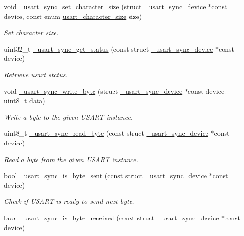 \begin{DoxyCompactItemize}
void \hyperlink{group___h_p_l_ga45ebffe94571d266e42b3dd882ad559d}{\+\_\+usart\+\_\+sync\+\_\+set\+\_\+character\+\_\+size} (struct \hyperlink{struct__usart__sync__device}{\+\_\+usart\+\_\+sync\+\_\+device} $\ast$const device, const enum \hyperlink{group___h_p_l_ga631ce7b4f60dccd392e6d6ef7d3cd4e2}{usart\+\_\+character\+\_\+size} size)
\begin{DoxyCompactList}\small\item\em Set character size. \end{DoxyCompactList}\item 
uint32\+\_\+t \hyperlink{group___h_p_l_ga512c769b924d59433542bf347980334b}{\+\_\+usart\+\_\+sync\+\_\+get\+\_\+status} (const struct \hyperlink{struct__usart__sync__device}{\+\_\+usart\+\_\+sync\+\_\+device} $\ast$const device)
\begin{DoxyCompactList}\small\item\em Retrieve usart status. \end{DoxyCompactList}\item 
void \hyperlink{group___h_p_l_ga6f9cc0e2020d49845bef97301bc692e0}{\+\_\+usart\+\_\+sync\+\_\+write\+\_\+byte} (struct \hyperlink{struct__usart__sync__device}{\+\_\+usart\+\_\+sync\+\_\+device} $\ast$const device, uint8\+\_\+t data)
\begin{DoxyCompactList}\small\item\em Write a byte to the given U\+S\+A\+RT instance. \end{DoxyCompactList}\item 
uint8\+\_\+t \hyperlink{group___h_p_l_gad6e42aaa92499103016d605362e35d97}{\+\_\+usart\+\_\+sync\+\_\+read\+\_\+byte} (const struct \hyperlink{struct__usart__sync__device}{\+\_\+usart\+\_\+sync\+\_\+device} $\ast$const device)
\begin{DoxyCompactList}\small\item\em Read a byte from the given U\+S\+A\+RT instance. \end{DoxyCompactList}\item 
bool \hyperlink{group___h_p_l_ga8bad9999c03b728f47848b2337393ec4}{\+\_\+usart\+\_\+sync\+\_\+is\+\_\+byte\+\_\+sent} (const struct \hyperlink{struct__usart__sync__device}{\+\_\+usart\+\_\+sync\+\_\+device} $\ast$const device)
\begin{DoxyCompactList}\small\item\em Check if U\+S\+A\+RT is ready to send next byte. \end{DoxyCompactList}\item 
bool \hyperlink{group___h_p_l_ga5bf04a89be94430de57acf53f9b35dd2}{\+\_\+usart\+\_\+sync\+\_\+is\+\_\+byte\+\_\+received} (const struct \hyperlink{struct__usart__sync__device}{\+\_\+usart\+\_\+sync\+\_\+device} $\ast$const device)

\end{DoxyCompactItemize}
